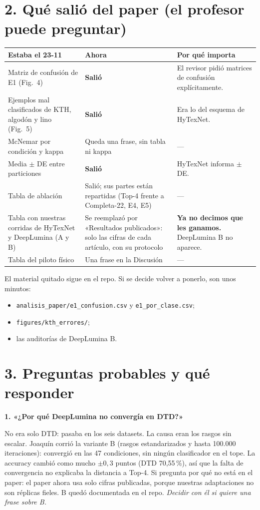 \documentclass[11pt,a4paper]{article}
\newcommand{\preg}[1]{\par\medskip\textbf{\color{azulosc}#1}\par}
\begin{document}
\section{2. Qué salió del paper (el profesor puede preguntar)}

\begin{tabularx}{\textwidth}{@{}YYY@{}}
\toprule
\textbf{Estaba el 23-11} & \textbf{Ahora} & \textbf{Por qué importa} \\
\midrule
Matriz de confusión de E1 (Fig.~4) & \textbf{Salió} & El revisor pidió matrices de confusión explícitamente. \\
Ejemplos mal clasificados de KTH, algodón y lino (Fig.~5) & \textbf{Salió} & Era lo del esquema de HyTexNet. \\
McNemar por condición y kappa & Queda una frase, sin tabla ni kappa & --- \\
Media $\pm$ DE entre particiones & \textbf{Salió} & HyTexNet informa $\pm$ DE. \\
Tabla de ablación & Salió; sus partes están repartidas (Top-4 frente a Completa-22, E4, E5) & --- \\
Tabla con nuestras corridas de HyTexNet y DeepLumina (A y B) & Se reemplazó por «Resultados publicados»: solo las cifras de cada artículo, con su protocolo & \textbf{\color{rojo}Ya no decimos que les ganamos.} DeepLumina B no aparece. \\
Tabla del piloto físico & Una frase en la Discusión & --- \\
\bottomrule
\end{tabularx}

\medskip
El material quitado sigue en el repo. Si se decide volver a ponerlo, son unos minutos:
\begin{itemize}
\item \texttt{analisis\_paper/e1\_confusion.csv} y \texttt{e1\_por\_clase.csv};
\item \texttt{figures/kth\_errores/};
\item las auditorías de DeepLumina B.
\end{itemize}

\section{3. Preguntas probables y qué responder}

\preg{1. «¿Por qué DeepLumina no convergía en DTD?»}
No era solo DTD: pasaba en los seis datasets. La causa eran los rasgos sin escalar. Joaquín corrió la variante B (rasgos estandarizados y hasta 100.000 iteraciones): convergió en las 47 condiciones, sin ningún clasificador en el tope. La accuracy cambió como mucho $\pm 0{,}3$ puntos (DTD 70,55\,\%), así que la falta de convergencia no explicaba la distancia a Top-4. Si pregunta por qué no está en el paper: el paper ahora usa solo cifras publicadas, porque nuestras adaptaciones no son réplicas fieles. B quedó documentada en el repo. \emph{Decidir con él si quiere una frase sobre B.}
\end{document}
